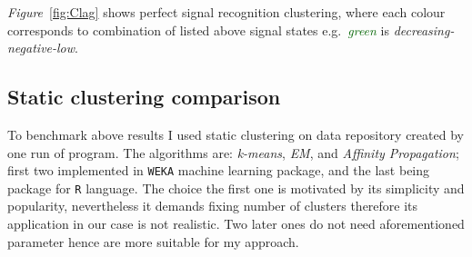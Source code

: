 \documentclass[11pt, letterpaper]{article}            %
\begin{document}
\emph{Figure}~\ref{fig:Clag} shows perfect signal recognition clustering, where each colour corresponds to combination of listed above signal states e.g.\ \emph{\textcolor{darkgreen}{green}} is \emph{decreasing-negative-low}.

\subsection{Static clustering comparison}
To benchmark above results I used static clustering on data repository created by one run of program. The algorithms are: \emph{k-means}, \emph{EM}, and \emph{Affinity Propagation}; first two implemented in \texttt{WEKA} machine learning package, and the last being package for \texttt{R} language. The choice the first one is motivated by its simplicity and popularity, nevertheless it demands fixing number of clusters therefore its application in our case is not realistic. Two later ones do not need aforementioned parameter hence are more suitable for my approach.\\
\end{document}
